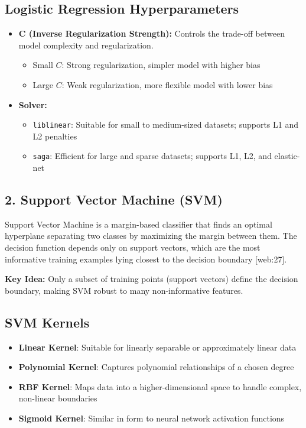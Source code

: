 \documentclass[11pt]{article}
\begin{document}
\subsection*{Logistic Regression Hyperparameters}
\begin{itemize}
\item \textbf{C (Inverse Regularization Strength):}
Controls the trade-off between model complexity and regularization.
\begin{itemize}
\item Small $C$: Strong regularization, simpler model with higher bias
\item Large $C$: Weak regularization, more flexible model with lower bias
\end{itemize}

\item \textbf{Solver:}
\begin{itemize}
\item \texttt{liblinear}: Suitable for small to medium-sized datasets; supports L1 and L2 penalties
\item \texttt{saga}: Efficient for large and sparse datasets; supports L1, L2, and elastic-net
\end{itemize}
\end{itemize}

\subsection*{2. Support Vector Machine (SVM)}
Support Vector Machine is a margin-based classifier that finds an optimal hyperplane separating two classes by maximizing the margin between them. The decision function depends only on support vectors, which are the most informative training examples lying closest to the decision boundary [web:27].

\textbf{Key Idea:}
Only a subset of training points (support vectors) define the decision boundary, making SVM robust to many non-informative features.

\subsection*{SVM Kernels}
\begin{itemize}
\item \textbf{Linear Kernel}: Suitable for linearly separable or approximately linear data
\item \textbf{Polynomial Kernel}: Captures polynomial relationships of a chosen degree
\item \textbf{RBF Kernel}: Maps data into a higher-dimensional space to handle complex, non-linear boundaries
\item \textbf{Sigmoid Kernel}: Similar in form to neural network activation functions
\end{itemize}
\end{document}
